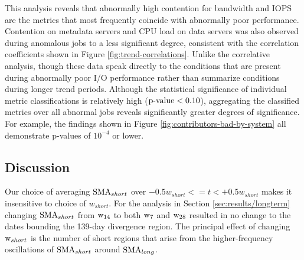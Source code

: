 This analysis reveals that abnormally high contention for bandwidth and IOPS are the metrics that most frequently coincide with abnormally poor performance.
Contention on metadata servers and CPU load on data servers was also observed during anomalous jobs to a less significant degree, consistent with the correlation coefficients shown in Figure \ref{fig:trend-correlations}.
Unlike the correlative analysis, though these data speak directly to the conditions that are present during abnormally poor I/O performance rather than summarize conditions during longer trend periods.
Although the statistical significance of individual metric classifications is relatively high (${\textup{p-value} < 0.10}$), aggregating the classified metrics over all abnormal jobs reveals significantly greater degrees of significance.
For example, the findings shown in Figure \ref{fig:contributors-bad-by-system} all demonstrate p-values of $10^{-4}$ or lower.

\subsection {Discussion}
\label{sec:results/discussion}


Our choice of averaging $\textup{SMA}_{short}$ over ${-0.5w_{short} <= t < +0.5w_{short}}$ makes it insensitive to choice of $w_{short}$.
For the analysis in Section \ref{sec:results/longterm} changing $\textup{SMA}_{short}$ from $\textup{w}_{14}$ to both $\textup{w}_{7}$ and $\textup{w}_{28}$ resulted in no change to the dates bounding the 139-day divergence region.
The principal effect of changing $\textup{w}_{short}$ is the number of short regions that arise from the higher-frequency oscillations of $\textup{SMA}_{short}$ around $\textup{SMA}_{long}$.

